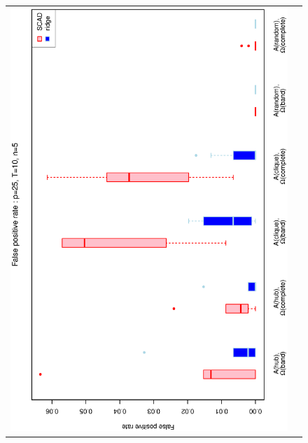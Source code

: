 \documentclass[a4paper]{article}
\begin{document}
\begin{figure}[h!]
\centering
\begin{tabular}{cc}
\includegraphics[scale=0.45,angle=270]{ROCfpr25T10N5_25.eps}
\\

\end{tabular}
\end{figure}
\end{document}
